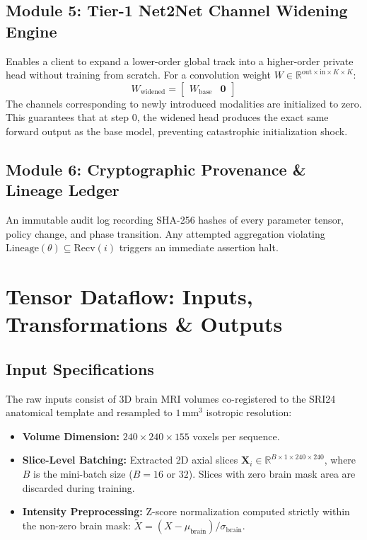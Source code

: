 \documentclass[10pt,a4paper]{article}
\begin{document}
\subsection{Module 5: Tier-1 Net2Net Channel Widening Engine}
Enables a client to expand a lower-order global track into a higher-order private head without training from scratch. For a convolution weight $W \in \mathbb{R}^{\text{out} \times \text{in} \times K \times K}$:
\begin{equation}
    W_{\text{widened}} = \begin{bmatrix} W_{\text{base}} & \mathbf{0} \end{bmatrix}
\end{equation}
The channels corresponding to newly introduced modalities are initialized to zero. This guarantees that at step 0, the widened head produces the exact same forward output as the base model, preventing catastrophic initialization shock.

\subsection{Module 6: Cryptographic Provenance \& Lineage Ledger}
An immutable audit log recording SHA-256 hashes of every parameter tensor, policy change, and phase transition. Any attempted aggregation violating $\text{Lineage}(\theta) \subseteq \text{Recv}(i)$ triggers an immediate assertion halt.

\section{Tensor Dataflow: Inputs, Transformations \& Outputs}

\subsection{Input Specifications}
The raw inputs consist of 3D brain MRI volumes co-registered to the SRI24 anatomical template and resampled to $1\,\text{mm}^3$ isotropic resolution:
\begin{itemize}[itemsep=1pt, topsep=1pt]
    \item \textbf{Volume Dimension:} $240 \times 240 \times 155$ voxels per sequence.
    \item \textbf{Slice-Level Batching:} Extracted 2D axial slices $\mathbf{X}_i \in \mathbb{R}^{B \times 1 \times 240 \times 240}$, where $B$ is the mini-batch size ($B=16$ or $32$). Slices with zero brain mask area are discarded during training.
    \item \textbf{Intensity Preprocessing:} Z-score normalization computed strictly within the non-zero brain mask: $\tilde{X} = (X - \mu_{\text{brain}}) / \sigma_{\text{brain}}$.
\end{itemize}
\end{document}
